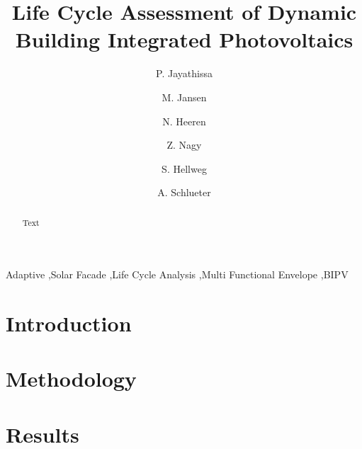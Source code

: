 \documentclass[preprint,12pt]{elsarticle} %
\begin{document}
\begin{frontmatter}

\title{Life Cycle Assessment of Dynamic Building Integrated Photovoltaics} 

\author[ita]{P. Jayathissa }
\address[ita]{Architecture and Building Systems, Institute of Technology in Architecture, Department of Architecture,\\ ETH Zurich, Switzerland} 

\author[ita]{M. Jansen}

\author[baug]{N. Heeren}
\address[baug]{Ecological System Design, Institute of Environmental Engineering,\\ ETH Zurich, Switzerland}

\author[ita]{Z. Nagy}

\author[baug]{S. Hellweg}


\author[ita]{A. Schlueter  }



\begin{abstract}
Text \\

\end{abstract}

\begin{keyword}
Adaptive \sep Solar Facade \sep Life Cycle Analysis \sep Multi Functional Envelope \sep BIPV
\end{keyword}

\end{frontmatter}

\section{Introduction}
\label{ch:introduction}


\section{Methodology}
\label{ch:method}


\section{Results}
\label{ch:results}

\end{document}
